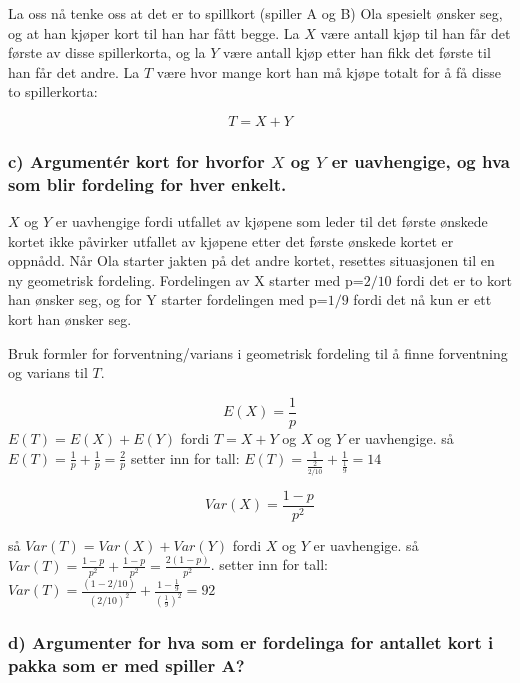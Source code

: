 \documentclass[
  12pt,
  a4paper,
  DIV=11,
  numbers=noendperiod]{scrartcl}
\begin{document}
La oss nå tenke oss at det er to spillkort (spiller A og B) Ola spesielt
ønsker seg, og at han kjøper kort til han har fått begge. La \(X\) være
antall kjøp til han får det første av disse spillerkorta, og la \(Y\)
være antall kjøp etter han fikk det første til han får det andre. La
\(T\) være hvor mange kort han må kjøpe totalt for å få disse to
spillerkorta:

\[ T = X + Y \]

\subsubsection{\texorpdfstring{c) Argumentér kort for hvorfor \(X\) og
\(Y\) er uavhengige, og hva som blir fordeling for hver
enkelt.}{c) Argumentér kort for hvorfor X og Y er uavhengige, og hva som blir fordeling for hver enkelt.}}\label{c-argumentuxe9r-kort-for-hvorfor-x-og-y-er-uavhengige-og-hva-som-blir-fordeling-for-hver-enkelt.}

\(X\) og \(Y\) er uavhengige fordi utfallet av kjøpene som leder til det
første ønskede kortet ikke påvirker utfallet av kjøpene etter det første
ønskede kortet er oppnådd. Når Ola starter jakten på det andre kortet,
resettes situasjonen til en ny geometrisk fordeling. Fordelingen av X
starter med p=\(2/10\) fordi det er to kort han ønsker seg, og for Y
starter fordelingen med p=\(1/9\) fordi det nå kun er ett kort han
ønsker seg.

Bruk formler for forventning/varians i geometrisk fordeling til å finne
forventning og varians til \(T\).

\[E(X) = \frac{1}{p}\] \(E(T) = E(X) + E(Y)\) fordi \(T = X + Y\) og
\(X\) og \(Y\) er uavhengige. så
\(E(T) = \frac{1}{p} + \frac{1}{p} = \frac{2}{p}\) setter inn for tall:
\(E(T) = \frac{1}{\frac{2}{2/10}} + \frac{1}{\frac{1}{9}} = 14\)

\[Var(X) = \frac{1-p}{p^2}\]

så \(Var(T) = Var(X) + Var(Y)\) fordi \(X\) og \(Y\) er uavhengige. så
\(Var(T) = \frac{1-p}{p^2} + \frac{1-p}{p^2} = \frac{2(1-p)}{p^2}\).
setter inn for tall:
\(Var(T) = \frac{(1-2/10)}{(2/10)^2} + \frac{1-\frac{1}{9}}{(\frac{1}{9})^2} = 92\)

\subsubsection{d) Argumenter for hva som er fordelinga for antallet kort
i pakka som er med spiller
A?}\label{d-argumenter-for-hva-som-er-fordelinga-for-antallet-kort-i-pakka-som-er-med-spiller-a}
\end{document}
